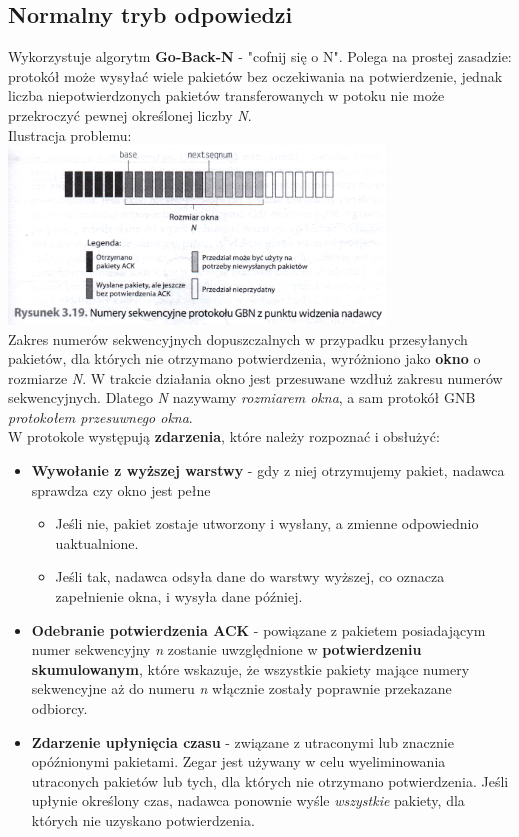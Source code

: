 \documentclass[a4paper,twoside]{article}
\begin{document}
	\subsection{Normalny tryb odpowiedzi}
	Wykorzystuje algorytm \textbf{Go-Back-N} - "cofnij się o N". Polega na prostej zasadzie: protokół może wysyłać wiele pakietów bez oczekiwania na potwierdzenie, jednak liczba niepotwierdzonych pakietów transferowanych w potoku nie może przekroczyć pewnej określonej liczby \emph{N}.\\
	Ilustracja problemu:\\
	\includegraphics[width=10cm]{./images/image13.jpg}\\
	Zakres numerów sekwencyjnych dopuszczalnych w przypadku przesyłanych pakietów, dla których nie otrzymano potwierdzenia, wyróżniono jako \textbf{okno} o rozmiarze \emph{N}. W trakcie działania okno jest przesuwane wzdłuż zakresu numerów sekwencyjnych. Dlatego \emph{N} nazywamy \textit{rozmiarem okna}, a sam protokół GNB \textit{protokołem przesuwnego okna}.\\
	W protokole występują \textbf{zdarzenia}, które należy rozpoznać i obsłużyć:
	\begin{itemize}
		\item \textbf{Wywołanie z wyższej warstwy} - gdy z niej otrzymujemy pakiet, nadawca sprawdza czy okno jest pełne
		\begin{itemize}
			\item Jeśli nie, pakiet zostaje utworzony i wysłany, a zmienne odpowiednio uaktualnione.
			\item Jeśli tak, nadawca odsyła dane do warstwy wyższej, co oznacza zapełnienie okna, i wysyła dane później.
		\end{itemize}
		\item \textbf{Odebranie potwierdzenia ACK} - powiązane z pakietem posiadającym numer sekwencyjny \emph{n} zostanie uwzględnione w \textbf{potwierdzeniu skumulowanym}, które wskazuje, że wszystkie pakiety mające numery sekwencyjne aż do numeru \emph{n} włącznie zostały poprawnie przekazane odbiorcy.
		\item \textbf{Zdarzenie upłynięcia czasu} - związane z utraconymi lub znacznie opóźnionymi pakietami. Zegar jest używany w celu wyeliminowania utraconych pakietów lub tych, dla których nie otrzymano potwierdzenia. Jeśli upłynie określony czas, nadawca ponownie wyśle \emph{wszystkie} pakiety, dla których nie uzyskano potwierdzenia.
	\end{itemize}
\end{document}
